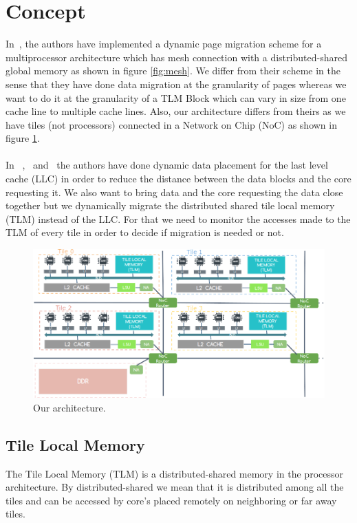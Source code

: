 \documentclass{listhesis}
\begin{document}
\section{Concept}
In~\cite{dynamicPageMigration}, the authors have implemented a dynamic page migration scheme for a multiprocessor architecture which has mesh connection with a distributed-shared global memory as shown in figure \ref{fig:mesh}. We differ from their scheme in the sense that they have done data migration at the granularity of pages whereas we want to do it at the granularity of a TLM Block which can vary in size from one cache line to multiple cache lines. Also, our architecture differs from theirs as we have tiles (not processors) connected in a Network on Chip (NoC) as shown in figure \ref{fig:processor}.\\
\\
In ~\cite{cacheDataPlacement1},~\cite{cacheDataPlacement3} and~\cite{cacheDataPlacement4} the authors have done dynamic data placement for the last level cache (LLC) in order to reduce the distance between the data blocks and the core requesting it. We also want to bring data and the core requesting the data close together but we dynamically migrate the distributed shared tile local memory (TLM) instead of the LLC. For that we need to monitor the accesses made to the TLM of every tile in order to decide if migration is needed or not. \\
\begin{figure}
  \includegraphics[width=\linewidth]{processor.png}
  \centering
  \caption{Our architecture.}
  \label{fig:processor}
\end{figure}
\subsection{Tile Local Memory}
The Tile Local Memory (TLM) is a distributed-shared memory in the processor architecture. By distributed-shared we mean that it is distributed among all the tiles and can be accessed by core's placed remotely on neighboring or far away tiles. 
\end{document}
